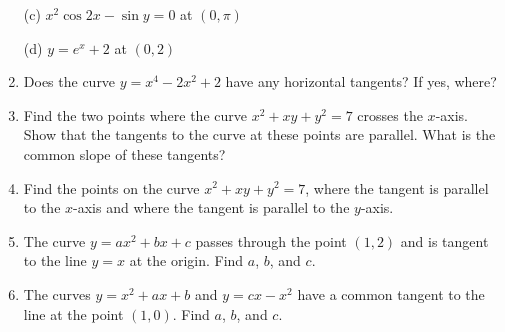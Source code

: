 \documentclass{article}
\begin{document}
\begin{enumerate}
(c) $x^2 \cos 2x - \sin y = 0$ at $(0, \pi)$

(d) $y = e^x + 2$ at $(0, 2)$

\item Does the curve $y = x^4 - 2x^2 + 2$ have any horizontal tangents? If yes, where?
\item Find the two points where the curve $x^2 + xy + y^2 = 7$ crosses the $x$-axis. Show that the tangents to the curve at these points are parallel. What is the common slope of these tangents?

\item Find the points on the curve $x^2 + xy + y^2 = 7$, where the tangent is parallel to the $x$-axis and where the tangent is parallel to the $y$-axis.

\item The curve $y = ax^2 + bx + c$ passes through the point $(1, 2)$ and is tangent to the line $y = x$ at the origin. Find $a$, $b$, and $c$.

\item The curves $y = x^2 + ax + b$ and $y = cx - x^2$ have a common tangent to the line at the point $(1, 0)$. Find $a$, $b$, and $c$.










\end{enumerate}
\end{document}
